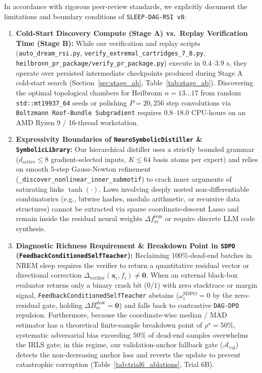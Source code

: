 \documentclass[11pt,a4paper]{article}
\begin{document}
In accordance with rigorous peer-review standards, we explicitly document the limitations and boundary conditions of \texttt{SLEEP-DAG-RSI v8}:
\begin{enumerate}
\item \textbf{Cold-Start Discovery Compute (Stage A) vs.\ Replay Verification Time (Stage B):}
While our verification and replay scripts (\texttt{auto\_dream\_rsi.py}, \texttt{verify\_extremal\_cartridges\_7\_8.py}, \texttt{heilbronn\_pr\_package/verify\_pr\_package.py}) execute in $0.4\text{--}3.9\text{ s}$, they operate over persisted intermediate checkpoints produced during Stage A cold-start search (Section~\ref{sec:stage_ab}, Table~\ref{tab:stage_ab}). Discovering the optimal topological chambers for Heilbronn $n=13\dots 17$ from random \texttt{std::mt19937\_64} seeds or polishing $P=20,256$ step convolutions via \texttt{Boltzmann Roof-Bundle Subgradient} requires $0.8\text{--}18.0$ CPU-hours on an AMD Ryzen 9 / 16-thread workstation.
\item \textbf{Expressivity Boundaries of \texttt{NeuroSymbolicDistiller} \& \texttt{SymbolicLibrary}:}
Our hierarchical distiller uses a strictly bounded grammar ($d_{\text{active}} \le 8$ gradient-selected inputs, $K \le 64$ basis atoms per expert) and relies on smooth 5-step Gauss-Newton refinement (\texttt{\_discover\_nonlinear\_inner\_submotif}) to crack inner arguments of saturating links $\tanh(\cdot)$. Laws involving deeply nested non-differentiable combinatorics (e.g., bitwise hashes, modulo arithmetic, or recursive data structures) cannot be extracted via sparse coordinate-descent Lasso and remain inside the residual neural weights $\Delta f_m^{\text{rem}}$ or require discrete LLM code synthesis.
\item \textbf{Diagnostic Richness Requirement \& Breakdown Point in \texttt{SDPO} (\texttt{FeedbackConditionedSelfTeacher}):}
Reclaiming $100\%$-dead-end batches in NREM sleep requires the verifier to return a quantitative residual vector or directional correction $\Delta_{\text{verifier}}(\mathbf{x}_i, f_i) \ne \mathbf{0}$. When an external black-box evaluator returns only a binary crash bit ($0/1$) with zero stacktrace or margin signal, \texttt{FeedbackConditionedSelfTeacher} abstains ($\omega_i^{\text{SDPO}} = 0$ by the zero-residual gate, holding $\Delta B_m^{\text{slow}} = \mathbf{0}$) and falls back to contrastive \texttt{DAG-DPO} repulsion. Furthermore, because the coordinate-wise median / MAD estimator has a theoretical finite-sample breakdown point of $\rho^\star = 50\%$, systematic adversarial bias exceeding $50\%$ of dead-end samples overwhelms the IRLS gate; in this regime, our validation-anchor fallback gate ($\mathcal{A}_{\text{val}}$) detects the non-decreasing anchor loss and reverts the update to prevent catastrophic corruption (Table~\ref{tab:trial6_ablations}, Trial 6B).

\end{enumerate}
\end{document}
